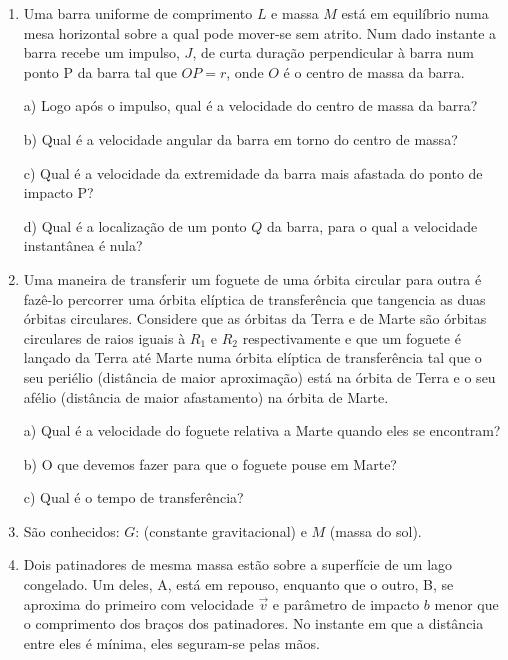 \begin{enumerate}[start=1,label={\bfseries Q\arabic*.}]
\resposta


\item Uma barra uniforme de comprimento $L$ e massa $M$ está em equilíbrio numa mesa horizontal sobre a qual pode mover-se sem atrito. Num dado instante a barra recebe um impulso, $J$, de curta duração perpendicular à barra num ponto P da barra tal que $OP = r$, onde  $O$ é o centro de massa da barra.

a) Logo após o impulso, qual é a velocidade do centro de massa da barra?

\resposta

b) Qual é a velocidade angular da barra em torno do centro de massa?

\resposta

c) Qual é a velocidade da extremidade da barra mais afastada do ponto de impacto P?

\resposta

d) Qual é a localização de um ponto $Q$ da barra, para o qual a velocidade instantânea é nula?

\resposta



\item Uma maneira de transferir um foguete de uma órbita circular para outra é fazê-lo percorrer uma órbita elíptica de transferência que tangencia as duas órbitas circulares. Considere que as órbitas da Terra e de Marte são órbitas circulares de raios iguais à $R_{1}$ e $R_{2}$ respectivamente e que um foguete é lançado da Terra até Marte numa órbita elíptica de transferência tal que o seu periélio (distância de maior aproximação) está na órbita de Terra e o seu afélio (distância de maior afastamento) na órbita de Marte.

a) Qual é a velocidade do foguete relativa a Marte quando eles se encontram?

\resposta

b) O que devemos fazer para que o foguete pouse em Marte?

\resposta

c) Qual é o tempo de transferência?

\item[] São conhecidos: $G$: (constante gravitacional) e $M$ (massa do sol).

\resposta

\item Dois patinadores de mesma massa estão sobre a superfície de um lago congelado. Um deles, A, está em repouso, enquanto que o outro, B, se aproxima do primeiro com velocidade $\vec{v}$ e parâmetro de impacto $b$ menor que o comprimento dos braços dos patinadores. No instante em que a distância entre eles é mínima, eles seguram-se pelas mãos.


\end{enumerate}
